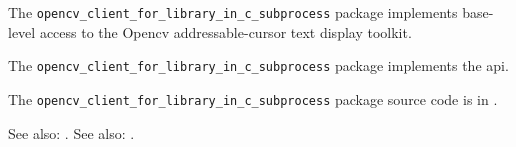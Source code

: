 
The {\tt opencv\_client\_for\_library\_in\_c\_subprocess} package implements base-level access to the Opencv addressable-cursor 
text display toolkit.

The {\tt opencv\_client\_for\_library\_in\_c\_subprocess} package implements the  api.

The {\tt opencv\_client\_for\_library\_in\_c\_subprocess} package source code is in .

See also:  .
See also:  .


